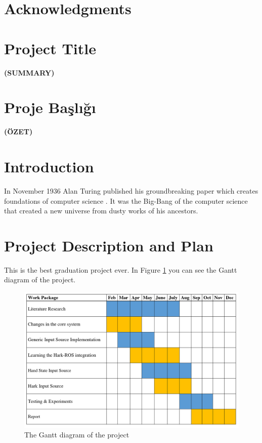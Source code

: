 \documentclass[a4paper, 12pt, titlepage]{article}
\newcommand{\thetitle}{Project Title}
\newcommand{\theturkishtitle}{Proje Başlığı}
\begin{document}
\newpage
\section*{Acknowledgments}

\newpage
\section*{\centering\thetitle}
\centerline{\fontsize{16pt}{21.6pt}\sffamily\bfseries (SUMMARY)}

\newpage
\section*{\centering\theturkishtitle}
\centerline{\fontsize{16pt}{21.6pt}\sffamily\bfseries (ÖZET)}

\newpage
\tableofcontents
\newpage

\section{Introduction}
In November 1936 Alan Turing published his groundbreaking paper which creates foundations of computer science \cite{turing1937computability}. It was the Big-Bang of the computer science that created a new universe from dusty works of his ancestors.
\newpage
\section{Project Description and Plan}
This is the best graduation project ever. In Figure \ref{fig:ganttdiagram} you can see the Gantt diagram of the project.

\begin{figure}[H]
    \centering
    \includegraphics[width=\linewidth]{gantt_diagram}
    \caption{The Gantt diagram of the project}
    \label{fig:ganttdiagram}
\end{figure}
\end{document}
